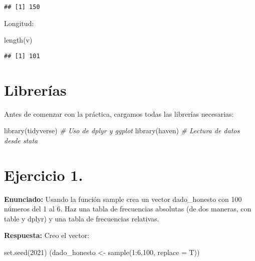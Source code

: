 \documentclass[
]{article}
\newenvironment{Shaded}{\begin{snugshade}}{\end{snugshade}}
\newcommand{\AttributeTok}[1]{\textcolor[rgb]{0.77,0.63,0.00}{#1}}
\newcommand{\CommentTok}[1]{\textcolor[rgb]{0.56,0.35,0.01}{\textit{#1}}}
\newcommand{\DecValTok}[1]{\textcolor[rgb]{0.00,0.00,0.81}{#1}}
\newcommand{\FunctionTok}[1]{\textcolor[rgb]{0.00,0.00,0.00}{#1}}
\newcommand{\NormalTok}[1]{#1}
\newcommand{\OtherTok}[1]{\textcolor[rgb]{0.56,0.35,0.01}{#1}}
\newcommand{\SpecialCharTok}[1]{\textcolor[rgb]{0.00,0.00,0.00}{#1}}
\begin{document}
\begin{verbatim}
## [1] 150
\end{verbatim}

Longitud:

\begin{Shaded}
\begin{Highlighting}[]
\FunctionTok{length}\NormalTok{(v)}
\end{Highlighting}
\end{Shaded}

\begin{verbatim}
## [1] 101
\end{verbatim}

\hypertarget{libreruxedas}{%
\section{Librerías}\label{libreruxedas}}

Antes de comenzar con la práctica, cargamos todas las librerías
necesarias:

\begin{Shaded}
\begin{Highlighting}[]
\FunctionTok{library}\NormalTok{(tidyverse) }\CommentTok{\# Uso de dplyr y ggplot}
\FunctionTok{library}\NormalTok{(haven) }\CommentTok{\# Lectura de datos desde stata}
\end{Highlighting}
\end{Shaded}

\hypertarget{ejercicio-1.}{%
\section{Ejercicio 1.}\label{ejercicio-1.}}

\textbf{Enunciado:} Usando la función sample crea un vector
dado\_honesto con 100 números del 1 al 6. Haz una tabla de frecuencias
absolutas (de dos maneras, con table y dplyr) y una tabla de frecuencias
relativas.

\textbf{Respuesta:} Creo el vector:

\begin{Shaded}
\begin{Highlighting}[]
\FunctionTok{set.seed}\NormalTok{(}\DecValTok{2021}\NormalTok{)}
\NormalTok{(dado\_honesto }\OtherTok{\textless{}{-}} \FunctionTok{sample}\NormalTok{(}\DecValTok{1}\SpecialCharTok{:}\DecValTok{6}\NormalTok{,}\DecValTok{100}\NormalTok{, }\AttributeTok{replace =}\NormalTok{ T))}
\end{Highlighting}
\end{Shaded}
\end{document}

